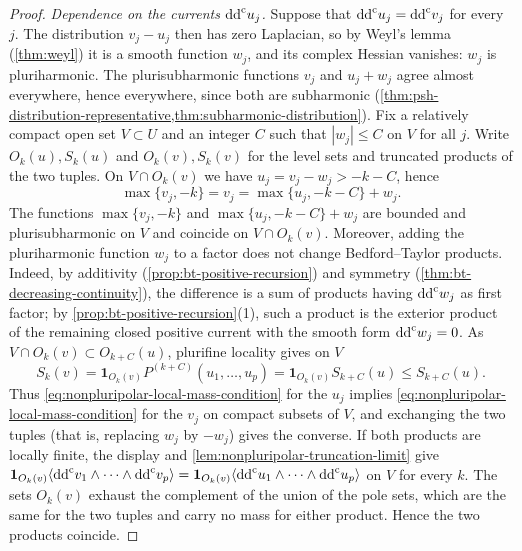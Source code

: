 \begin{proof}
\emph{Dependence on the currents $\mathrm{dd}^{\mathrm{c}} u_j$.} Suppose that $\mathrm{dd}^{\mathrm{c}} u_j=\mathrm{dd}^{\mathrm{c}} v_j$ for every $j$. The distribution $v_j-u_j$ then has zero Laplacian, so by Weyl's lemma (\cref{thm:weyl}) it is a smooth function $w_j$, and its complex Hessian vanishes: $w_j$ is pluriharmonic. The plurisubharmonic functions $v_j$ and $u_j+w_j$ agree almost everywhere, hence everywhere, since both are subharmonic (\cref{thm:psh-distribution-representative,thm:subharmonic-distribution}). Fix a relatively compact open set $V\subset U$ and an integer $C$ such that $|w_j|\leq C$ on $V$ for all $j$. Write $O_k(u),S_k(u)$ and $O_k(v),S_k(v)$ for the level sets and truncated products of the two tuples. On $V\cap O_k(v)$ we have $u_j=v_j-w_j>-k-C$, hence
\[
 \max\{v_j,-k\}=v_j=\max\{u_j,-k-C\}+w_j .
\]
The functions $\max\{v_j,-k\}$ and $\max\{u_j,-k-C\}+w_j$ are bounded and plurisubharmonic on $V$ and coincide on $V\cap O_k(v)$. Moreover, adding the pluriharmonic function $w_j$ to a factor does not change Bedford--Taylor products. Indeed, by additivity (\cref{prop:bt-positive-recursion}) and symmetry (\cref{thm:bt-decreasing-continuity}), the difference is a sum of products having $\mathrm{dd}^{\mathrm{c}} w_j$ as first factor; by \cref{prop:bt-positive-recursion}(1), such a product is the exterior product of the remaining closed positive current with the smooth form $\mathrm{dd}^{\mathrm{c}} w_j=0$. As $V\cap O_k(v)\subset O_{k+C}(u)$, plurifine locality gives on $V$
\[
 S_k(v)=\mathbf1_{O_k(v)}P^{(k+C)}(u_1,\ldots,u_p)=\mathbf1_{O_k(v)}S_{k+C}(u)\leq S_{k+C}(u).
\]
Thus \eqref{eq:nonpluripolar-local-mass-condition} for the $u_j$ implies \eqref{eq:nonpluripolar-local-mass-condition} for the $v_j$ on compact subsets of $V$, and exchanging the two tuples (that is, replacing $w_j$ by $-w_j$) gives the converse. If both products are locally finite, the display and \cref{lem:nonpluripolar-truncation-limit} give $\mathbf1_{O_k(v)}\langle\mathrm{dd}^{\mathrm{c}} v_1\wedge\cdots\wedge\mathrm{dd}^{\mathrm{c}} v_p\rangle=\mathbf1_{O_k(v)}\langle\mathrm{dd}^{\mathrm{c}} u_1\wedge\cdots\wedge\mathrm{dd}^{\mathrm{c}} u_p\rangle$ on $V$ for every $k$. The sets $O_k(v)$ exhaust the complement of the union of the pole sets, which are the same for the two tuples and carry no mass for either product. Hence the two products coincide.


\end{proof}
